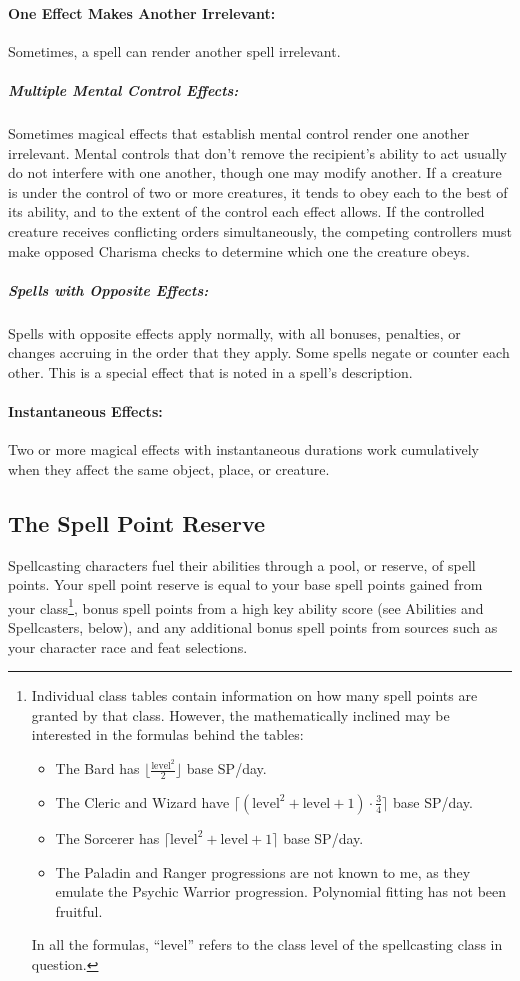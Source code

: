 \paragraph{One Effect Makes Another Irrelevant:} Sometimes, a spell can render another spell irrelevant.

\subparagraph{Multiple Mental Control Effects:} Sometimes magical effects that establish mental control render one another irrelevant. 
Mental controls that don't remove the recipient's ability to act usually do not interfere with one another, though one may modify another. If a creature is under the control of two or more creatures, it tends to obey each to the best of its ability, and to the extent of the control each effect allows. 
If the controlled creature receives conflicting orders simultaneously, the competing controllers must make opposed Charisma checks to determine which one the creature obeys.

\subparagraph{Spells with Opposite Effects:} Spells with opposite effects apply normally, with all bonuses, penalties, or changes accruing in the order that they apply.
Some spells negate or counter each other. This is a special effect that is noted in a spell's description.

\paragraph{Instantaneous Effects:} Two or more magical effects with instantaneous durations work cumulatively when they affect the same object, place, or creature.

\subsection{The Spell Point Reserve}
Spellcasting characters fuel their abilities through a pool, or reserve, of spell points. 
Your spell point reserve is equal to your base spell points gained from your class\footnote{
Individual class tables contain information on how many spell points are granted by that class. However, the mathematically inclined may be interested in the formulas behind the tables:
\begin{itemize}
 \item The Bard has $\lfloor\frac{\text{level}^2}{2}\rfloor$ base SP/day.
 \item The Cleric and Wizard have $\lceil (\text{level}^2+\text{level}+1) \cdot \frac{3}{4}\rceil$ base SP/day.
 \item The Sorcerer has $\lceil \text{level}^2+\text{level}+1 \rceil$ base SP/day.
 \item The Paladin and Ranger progressions are not known to me, as they emulate the Psychic Warrior progression. Polynomial fitting has not been fruitful.
\end{itemize}
In all the formulas, ``level'' refers to the class level of the spellcasting class in question.}, bonus spell points from a high key ability score (see Abilities and Spellcasters, below), and any additional bonus spell points from sources such as your character race and feat selections.
